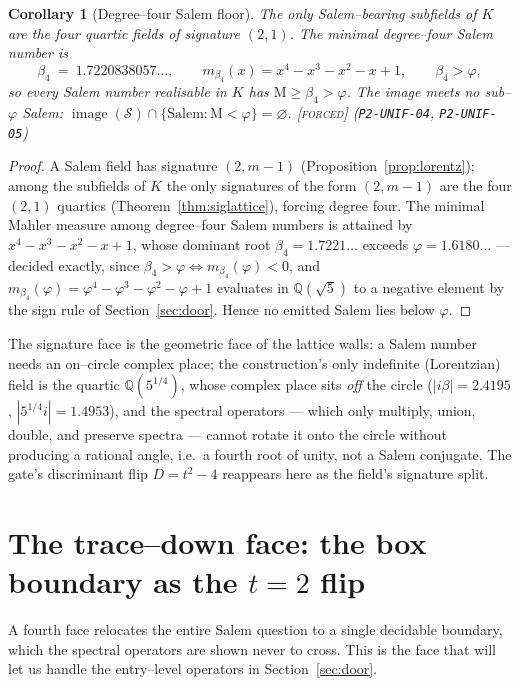 \documentclass[11pt]{article}
\theoremstyle{plain}
\newtheorem{corollary}[theorem]{Corollary}
\theoremstyle{definition}
\theoremstyle{remark}
\newcommand{\forced}{\textcolor{forcedc}{\textsc{[forced]}}}
\newcommand{\Q}{\mathbb{Q}}
\newcommand{\Mah}{\mathrm{M}}
\newcommand{\abs}[1]{\left\lvert #1 \right\rvert}
\newcommand{\Scal}{\mathcal{S}}
\begin{document}
\begin{corollary}[Degree--four Salem floor]\label{cor:deg4}
The only Salem--bearing subfields of $K$ are the four quartic fields of signature $(2,1)$. The minimal degree--four Salem number is
\[
\beta_4\ =\ 1.7220838057\ldots,\qquad m_{\beta_4}(x)=x^4-x^3-x^2-x+1,\qquad \beta_4>\varphi,
\]
so every Salem number realisable in $K$ has $\Mah\ge\beta_4>\varphi$. The image meets no sub--$\varphi$ Salem: $\operatorname{image}(\Scal)\cap\{\text{Salem}:\Mah<\varphi\}=\varnothing$. \forced{} {\small(\texttt{P2-UNIF-04}, \texttt{P2-UNIF-05})}
\end{corollary}
\begin{proof}
A Salem field has signature $(2,m-1)$ (Proposition~\ref{prop:lorentz}); among the subfields of $K$ the only signatures of the form $(2,m-1)$ are the four $(2,1)$ quartics (Theorem~\ref{thm:siglattice}), forcing degree four. The minimal Mahler measure among degree--four Salem numbers is attained by $x^4-x^3-x^2-x+1$, whose dominant root $\beta_4=1.7221\ldots$ exceeds $\varphi=1.6180\ldots$ --- decided exactly, since $\beta_4>\varphi\iff m_{\beta_4}(\varphi)<0$, and $m_{\beta_4}(\varphi)=\varphi^4-\varphi^3-\varphi^2-\varphi+1$ evaluates in $\Q(\sqrt5)$ to a negative element by the sign rule of Section~\ref{sec:door}. Hence no emitted Salem lies below $\varphi$.
\end{proof}

The signature face is the geometric face of the lattice walls: a Salem number needs an on--circle complex place; the construction's only indefinite (Lorentzian) field is the quartic $\Q(5^{1/4})$, whose complex place sits \emph{off} the circle ($\abs{i\beta}=2.4195$, $\abs{5^{1/4}i}=1.4953$), and the spectral operators --- which only multiply, union, double, and preserve spectra --- cannot rotate it onto the circle without producing a rational angle, i.e.\ a fourth root of unity, not a Salem conjugate. The gate's discriminant flip $D=t^2-4$ reappears here as the field's signature split.

\section{The trace--down face: the box boundary as the \texorpdfstring{$t=2$}{t=2} flip}\label{sec:flipface}

A fourth face relocates the entire Salem question to a single decidable boundary, which the spectral operators are shown never to cross. This is the face that will let us handle the entry--level operators in Section~\ref{sec:door}.
\end{document}
